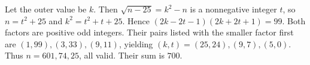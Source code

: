 Let the outer value be $ k $. Then $\sqrt{n-25}=k^2-n $ is a nonnegative integer $ t $, so $ n=t^2+25 $ and $ k^2=t^2+t+25 $. Hence $(2k-2t-1)(2k+2t+1)=99 $. Both factors are positive odd integers. Their pairs listed with the smaller factor first are $(1,99),(3,33),(9,11)$, yielding $(k,t)=(25,24),(9,7),(5,0)$. Thus $ n=601,74,25 $, all valid. Their sum is $\boxed{700}$.
